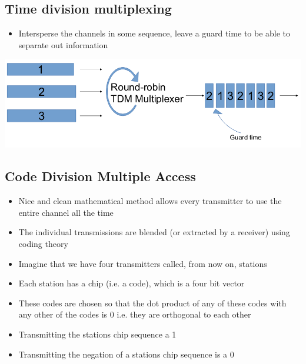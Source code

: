 \documentclass{article}[18pt]
\begin{document}
\subsection{Time division multiplexing}
\begin{itemize}
	\item Intersperse the channels in some sequence, leave a guard time to be able to separate out information
\end{itemize}
\begin{center}
	\includegraphics[scale=0.7]{TDM}
\end{center}
\subsection{Code Division Multiple Access}
\begin{itemize}
	\item Nice and clean mathematical method allows every transmitter to use the entire channel all the time
	\item The individual transmissions are blended (or extracted by a receiver) using coding theory
	\item Imagine that we have four transmitters called, from now on, stations
	\item Each station has a chip (i.e. a code), which is a four bit vector
	\item These codes are chosen so that the dot product of any of these codes with any other of the codes is 0 i.e. they are orthogonal to each other
	\item Transmitting the stations chip sequence a 1
	\item Transmitting the negation of a stations chip sequence is a 0
\end{itemize}
\end{document}
